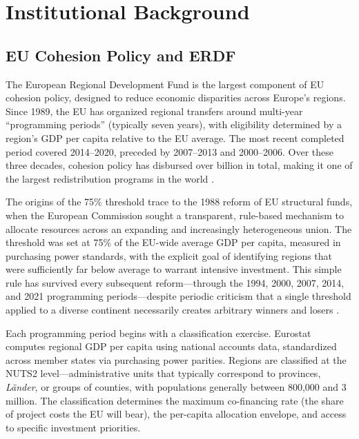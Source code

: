 \documentclass[12pt]{article}
\begin{document}
\section{Institutional Background}
\label{sec:background}

\subsection{EU Cohesion Policy and ERDF}

The European Regional Development Fund is the largest component of EU cohesion policy, designed to reduce economic disparities across Europe's regions. Since 1989, the EU has organized regional transfers around multi-year ``programming periods'' (typically seven years), with eligibility determined by a region's GDP per capita relative to the EU average. The most recent completed period covered 2014--2020, preceded by 2007--2013 and 2000--2006. Over these three decades, cohesion policy has disbursed over  billion in total, making it one of the largest redistribution programs in the world \citep{DallErbaLeGallo2008, Cappelen2003}.

The origins of the 75\% threshold trace to the 1988 reform of EU structural funds, when the European Commission sought a transparent, rule-based mechanism to allocate resources across an expanding and increasingly heterogeneous union. The threshold was set at 75\% of the EU-wide average GDP per capita, measured in purchasing power standards, with the explicit goal of identifying regions that were sufficiently far below average to warrant intensive investment. This simple rule has survived every subsequent reform---through the 1994, 2000, 2007, 2014, and 2021 programming periods---despite periodic criticism that a single threshold applied to a diverse continent necessarily creates arbitrary winners and losers \citep{BoldrinCanova2001, Barca2009}.

Each programming period begins with a classification exercise. Eurostat computes regional GDP per capita using national accounts data, standardized across member states via purchasing power parities. Regions are classified at the NUTS2 level---administrative units that typically correspond to provinces, \emph{L\"ander}, or groups of counties, with populations generally between 800,000 and 3 million. The classification determines the maximum co-financing rate (the share of project costs the EU will bear), the per-capita allocation envelope, and access to specific investment priorities.
\end{document}
